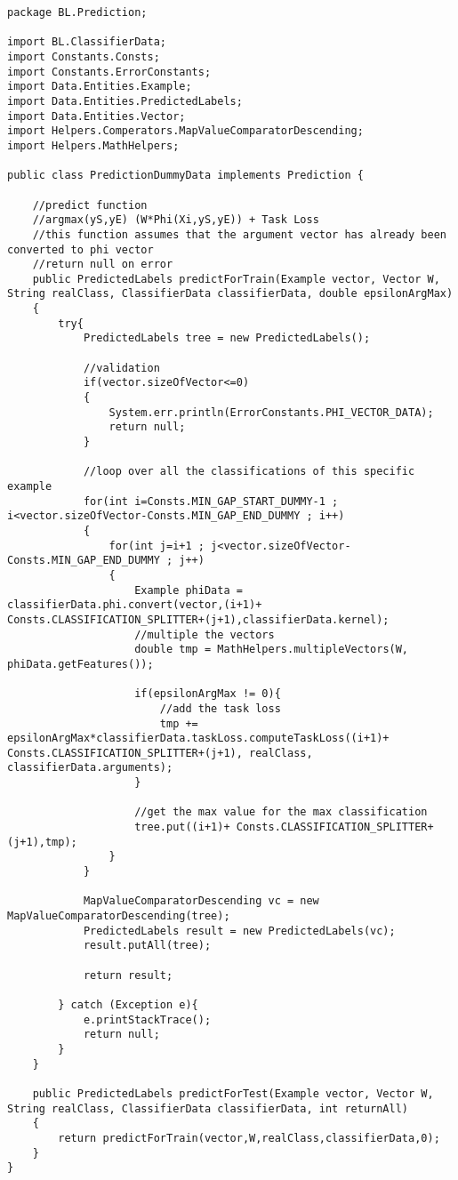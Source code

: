 \documentclass[11pt, oneside]{article}   	%
\begin{document}
\begin{lstlisting}
package BL.Prediction;

import BL.ClassifierData;
import Constants.Consts;
import Constants.ErrorConstants;
import Data.Entities.Example;
import Data.Entities.PredictedLabels;
import Data.Entities.Vector;
import Helpers.Comperators.MapValueComparatorDescending;
import Helpers.MathHelpers;

public class PredictionDummyData implements Prediction {

    //predict function
    //argmax(yS,yE) (W*Phi(Xi,yS,yE)) + Task Loss
    //this function assumes that the argument vector has already been converted to phi vector
    //return null on error
    public PredictedLabels predictForTrain(Example vector, Vector W, String realClass, ClassifierData classifierData, double epsilonArgMax)
    {
        try{
            PredictedLabels tree = new PredictedLabels();

            //validation
            if(vector.sizeOfVector<=0)
            {
                System.err.println(ErrorConstants.PHI_VECTOR_DATA);
                return null;
            }

            //loop over all the classifications of this specific example
            for(int i=Consts.MIN_GAP_START_DUMMY-1 ; i<vector.sizeOfVector-Consts.MIN_GAP_END_DUMMY ; i++)
            {
                for(int j=i+1 ; j<vector.sizeOfVector- Consts.MIN_GAP_END_DUMMY ; j++)
                {
                    Example phiData = classifierData.phi.convert(vector,(i+1)+ Consts.CLASSIFICATION_SPLITTER+(j+1),classifierData.kernel);
                    //multiple the vectors
                    double tmp = MathHelpers.multipleVectors(W, phiData.getFeatures());

                    if(epsilonArgMax != 0){
                        //add the task loss
                        tmp += epsilonArgMax*classifierData.taskLoss.computeTaskLoss((i+1)+ Consts.CLASSIFICATION_SPLITTER+(j+1), realClass, classifierData.arguments);
                    }

                    //get the max value for the max classification
                    tree.put((i+1)+ Consts.CLASSIFICATION_SPLITTER+(j+1),tmp);
                }
            }

            MapValueComparatorDescending vc = new MapValueComparatorDescending(tree);
            PredictedLabels result = new PredictedLabels(vc);
            result.putAll(tree);

            return result;

        } catch (Exception e){
            e.printStackTrace();
            return null;
        }
    }

    public PredictedLabels predictForTest(Example vector, Vector W, String realClass, ClassifierData classifierData, int returnAll)
    {
        return predictForTrain(vector,W,realClass,classifierData,0);
    }
}
\end{lstlisting}
\end{document}
